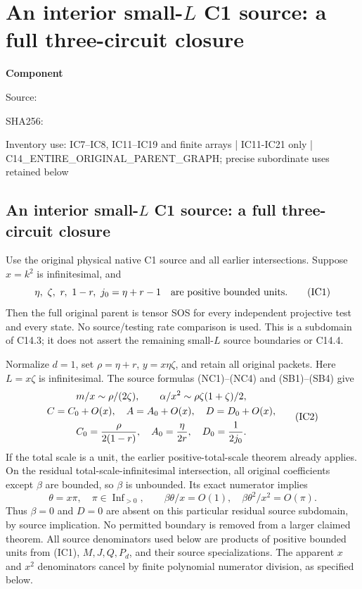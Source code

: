 \chapter{An interior small-$L$ C1 source: a full three-circuit closure}
\label{component:pe3ef590c01d6}
\noindent\textbf{Component }\par
{\small\noindent Source: \par}
{\small\noindent SHA256: \par}
{\small\noindent Inventory use: IC7--IC8, IC11--IC19 and finite arrays | IC11-IC21 only | C14\_\allowbreak{}ENTIRE\_\allowbreak{}ORIGINAL\_\allowbreak{}PARENT\_\allowbreak{}GRAPH; precise subordinate uses retained below\par}
\medskip
\section[An interior small-L C1 source: a full three-circuit closure]{An interior small-$L$ C1 source: a full three-circuit closure}
\label{pe3ef590c01d6:sec:r9-c1-small-interior}

\begin{theorem}
Use the original physical native C1 source and all earlier intersections.
Suppose $x=k^2$ is infinitesimal, and
\[
 \eta,\ \zeta,\ r,\ 1-r,\ j_0=\eta+r-1
       \quad\hbox{are positive bounded units}.                 \tag{IC1}
\]
Then the full original parent is tensor SOS for every independent
projective test and every state. No source/testing rate comparison is
used. This is a subdomain of C14.3; it does not assert the remaining
small-$L$ source boundaries or C14.4.
\end{theorem}

Normalize $d=1$, set $\rho=\eta+r$, $y=x\eta\zeta$, and retain
all original packets. Here $L=x\zeta$ is infinitesimal. The source
formulas (NC1)--(NC4) and (SB1)--(SB4) give
\[
 \begin{gathered}
 m/x\sim\rho/(2\zeta),\qquad
 \alpha/x^2\sim\rho\zeta(1+\zeta)/2,\\
 C=C_0+O(x),\quad A=A_0+O(x),\quad D=D_0+O(x),\\
 C_0={\rho\over2(1-r)},\quad A_0={\eta\over2r},
 \quad D_0={1\over2j_0}.                                \end{gathered} \tag{IC2}
\]
If the total scale is a unit, the earlier positive-total-scale theorem
already applies. On the residual total-scale-infinitesimal intersection,
all original coefficients except $\beta$ are bounded, so $\beta$ is
unbounded. Its exact numerator implies
\[
 \theta=x\pi,\quad\pi\in\operatorname{Inf}_{>0},\qquad
 \beta\theta/x=O(1),\quad
 \beta\theta^2/x^2=O(\pi).                               \tag{IC3}
\]
Thus $\beta=0$ and $D=0$ are absent on this particular residual source
subdomain, by source implication. No permitted boundary is removed
from a larger claimed theorem. All source denominators used below are
products of positive bounded units from (IC1), $M,J,Q,P_d$, and their
source specializations. The apparent $x$ and $x^2$ denominators cancel
by finite polynomial numerator division, as specified below.

